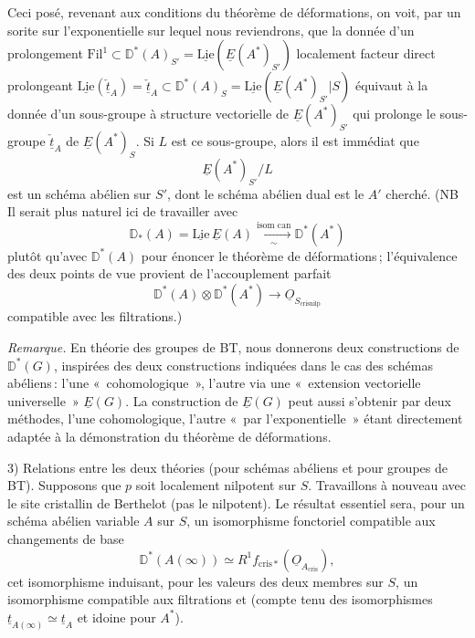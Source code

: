 \documentclass[11pt,a4paper]{article}
\begin{document}
Ceci posé, revenant aux conditions du théorème de déformations, on voit, par un sorite sur l'exponentielle sur lequel nous reviendrons, que la donnée d'un prolongement $\mathrm{Fil}^1 \subset \mathbb{D}^*(A)_{S'} = \underline{\mathrm{Lie}}(\underline{E}(A^*)_{S'})$ localement facteur direct prolongeant $\underline{\mathrm{Lie}}(\underline{\check{t}}_A) = \underline{\check{t}}_A \subset \mathbb{D}^*(A)_S = \underline{\mathrm{Lie}}(\underline{E}(A^*)_{S'}|S)$ équivaut à la donnée d'un sous-groupe  à structure vectorielle de $\underline{E}(A^*)_{S'}$ qui prolonge le sous-groupe $\underline{\check{t}}_A$ de $\underline{E}(A^*)_S$. Si $L$ est ce sous-groupe, alors il est immédiat que \struck{\ill{}}
\[
  \underline{E}(A^*)_{S'}/L
\]
est un schéma abélien sur $S'$, dont le schéma abélien dual est le $A'$ cherché. (NB Il serait plus naturel ici de travailler avec 
\[
  \mathbb{D}_*(A) = \underline{\mathrm{Lie}}\,\underline{E}(A) \xrightarrow[\sim]{\text{isom can}} \mathbb{D}^*(A^*)
\]
plutôt qu'avec $\mathbb{D}^*(A)$ pour énoncer le théorème de déformations\,; l'équivalence des deux points de vue provient de l'accouplement parfait
\[
  \mathbb{D}^*(A) \otimes \mathbb{D}^*(A^*) \longrightarrow \underline{O}_{S_{\mathrm{crisnilp}}}
\]
compatible avec les filtrations.)

\emph{Remarque.} En théorie des groupes de BT, nous donnerons deux constructions de $\mathbb{D}^*(G)$, inspirées des deux constructions indiquées dans le cas des schémas abéliens\,: l'une «~cohomologique~», l'autre via une «~extension vectorielle universelle~» $\underline{E}(G)$. La construction de $\underline{E}(G)$ peut aussi s'obtenir par deux méthodes, l'une cohomologique, l'autre «~par l'exponentielle~» étant directement adaptée à la démonstration du théorème de déformations.

3)  Relations entre les deux théories (pour schémas abéliens et pour groupes de BT). Supposons que $p$ soit localement nilpotent sur $S$. Travaillons  à nouveau avec le site cristallin de Berthelot (pas le nilpotent). Le résultat essentiel sera, pour un schéma abélien variable $A$ sur $S$, un isomorphisme fonctoriel compatible aux changements de base
\[
  \mathbb{D}^*(A(\infty)) \simeq R^1 f_{\mathrm{cris}*}(\underline{O}_{A_{\mathrm{cris}}}) ,
\]
cet isomorphisme induisant, pour les valeurs des deux membres sur $S$, un isomorphisme compatible aux filtrations \quad et \quad (compte tenu des isomorphismes $\underline{t}_{A(\infty)} \simeq \underline{t}_A$ et idoine pour $A^*$). 
\end{document}
